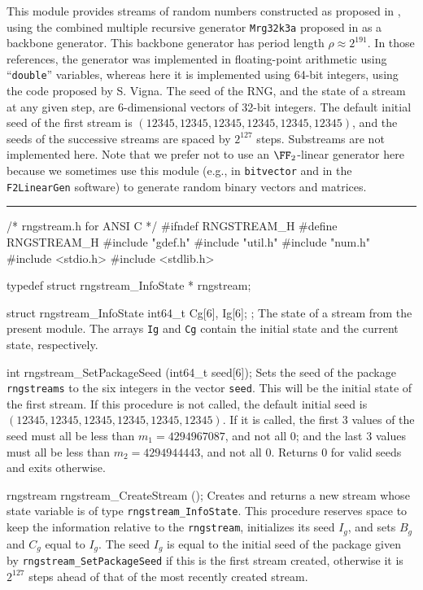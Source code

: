 
This module provides streams of random numbers constructed as proposed in \cite{rLEC02a},
using the combined multiple recursive generator {\tt Mrg32k3a} proposed in \cite{rLEC99b}
as a backbone generator.  This backbone generator has period length $\rho\approx 2^{191}$.
In those references, the generator was implemented in floating-point arithmetic
using ``\texttt{double}'' variables, whereas here it is implemented using 64-bit integers,
using the code proposed by S. Vigna.
The seed of the RNG, and the state of a stream at any given step,
are 6-dimensional vectors of 32-bit integers.
The default initial seed of the first stream is
$(12345, 12345, 12345, 12345, 12345, 12345)$,
and the seeds of the successive streams are spaced by $2^{127}$ steps.
Substreams are not implemented here.
Note that we prefer not to use an $\FF_2$-linear generator here because 
we sometimes use this module (e.g., in \texttt{bitvector} and in the 
\texttt{F2LinearGen} software) to generate random binary vectors and matrices. 


\bigskip\hrule

\code\hide
/* rngstream.h for ANSI C */
#ifndef RNGSTREAM_H
#define RNGSTREAM_H
\endhide
#include "gdef.h"
#include "util.h"
#include "num.h"
#include <stdio.h>
#include <stdlib.h>

typedef struct rngstream_InfoState * rngstream;

struct rngstream_InfoState {
   int64_t Cg[6], Ig[6];
};
\endcode
 \tab
   The state of a stream from the present module.
   The arrays {\tt Ig} and {\tt Cg} contain the initial state
   and the current state, respectively.
 \endtab
\code

int rngstream_SetPackageSeed (int64_t seed[6]);
\endcode
  \tab  Sets the seed of the package {\tt rngstreams} to the
   six integers in the vector {\tt seed}.
   This will be the initial state of the first stream.
   If this procedure is not called, the default initial seed
   is $(12345, 12345, 12345, 12345, 12345, 12345)$.
   If it is called, the first 3 values of the seed must all be
   less than $m_1 = 4294967087$, and not all 0;
   and the last 3 values
   must all be less than $m_2 = 4294944443$, and not all 0.
   Returns 0 for valid seeds and exits otherwise.
 \endtab
\code

rngstream rngstream_CreateStream ();
\endcode
 \tab Creates and returns a new stream
   whose state variable is of type {\tt rngstream\_InfoState}.
   This procedure reserves space to keep the information relative to
   the {\tt rngstream}, initializes its seed $I_g$,
   and sets $B_g$ and $C_g$ equal to $I_g$.
   The seed $I_g$ is equal to the initial seed of the package given by
   {\tt rngstream\_SetPackageSeed} if this is the first stream created,
   otherwise it is $2^{127}$ steps ahead of that of the most recently created stream.
 \endtab
\code

